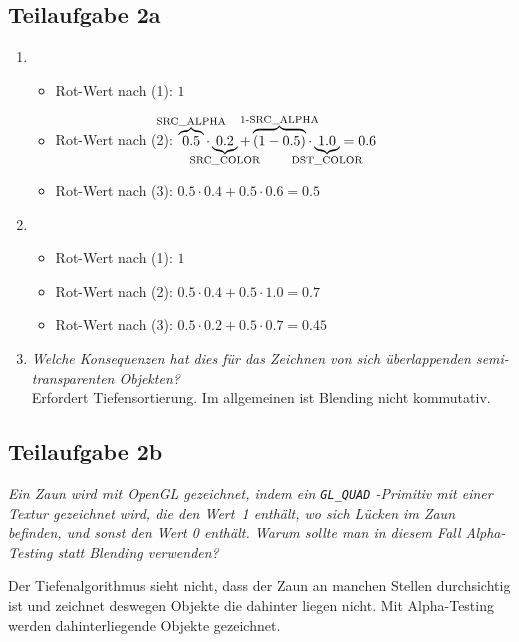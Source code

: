 \documentclass[a4paper]{scrartcl}
\begin{document}
\subsection*{Teilaufgabe 2a}
\begin{enumerate}[label=(\Roman*)]
    \item
    \begin{itemize}
        \item Rot-Wert nach (1): $1$
        \item Rot-Wert nach (2): $\overbrace{0.5}^{\mathclap{\text{SRC\_ALPHA}}} \cdot \underbrace{0.2}_{\mathclap{\text{SRC\_COLOR}}} + \overbrace{(1-0.5)}^{\mathclap{\text{1-SRC\_ALPHA}}} \cdot \underbrace{1.0}_{\mathclap{\text{DST\_COLOR}}} = 0.6$\vspace{2.5pt}
        \item Rot-Wert nach (3): $0.5\cdot0.4+0.5\cdot0.6=0.5$
    \end{itemize}
    \item
    \begin{itemize}
        \item Rot-Wert nach (1): $1$
        \item Rot-Wert nach (2): $0.5\cdot0.4+0.5\cdot1.0=0.7$
        \item Rot-Wert nach (3): $0.5\cdot0.2+0.5\cdot0.7=0.45$
    \end{itemize}
    \item \textit{Welche Konsequenzen hat dies für das Zeichnen von sich
                  überlappenden semi-transparenten Objekten?}\\
          Erfordert Tiefensortierung. Im allgemeinen ist Blending nicht
          kommutativ.
\end{enumerate}

\subsection*{Teilaufgabe 2b}
\textit{Ein Zaun wird mit OpenGL gezeichnet, indem ein \texttt{GL\_QUAD}
-Primitiv mit einer Textur gezeichnet wird, die den Wert~1 enthält, wo sich
Lücken im Zaun befinden, und sonst den Wert 0 enthält. Warum sollte man in
diesem Fall Alpha-Testing statt Blending verwenden?}

Der Tiefenalgorithmus sieht nicht, dass der Zaun an manchen Stellen
durchsichtig ist und zeichnet deswegen Objekte die dahinter liegen nicht. Mit
Alpha-Testing werden dahinterliegende Objekte gezeichnet.
\end{document}
